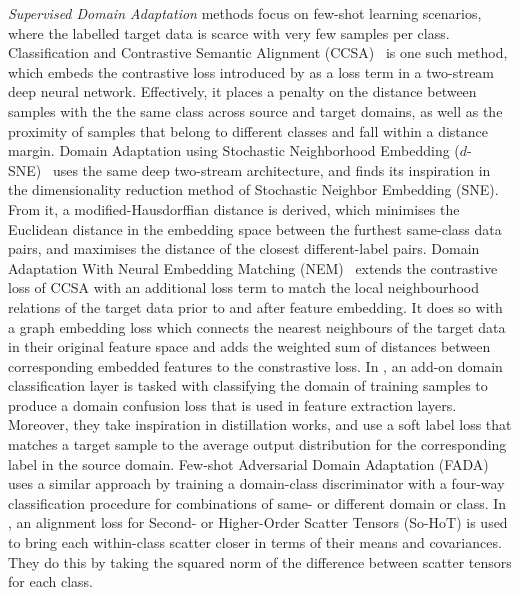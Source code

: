 \documentclass[journal]{IEEEtran}
\begin{document}
\textit{Supervised Domain Adaptation} methods focus on few-shot learning scenarios, where the labelled target data is scarce with very few samples per class. 
Classification and Contrastive Semantic Alignment (CCSA)~\cite{motiian2017ccsa} is one such method, which embeds the contrastive loss introduced by \citet{hadsell2006dimensionality} as a loss term in a two-stream deep neural network. Effectively, it places a penalty on the distance between samples with the the same class across source and target domains, as well as the proximity of samples that belong to different classes and fall within a distance margin.
Domain Adaptation using Stochastic Neighborhood Embedding ($d$-SNE)~\cite{xu2019dsne} uses the same deep two-stream architecture, and finds its inspiration in the dimensionality reduction method of Stochastic Neighbor Embedding (SNE). From it, a modified-Hausdorffian distance is derived, which minimises the Euclidean distance in the embedding space between the furthest same-class data pairs, and maximises the distance of the closest different-label pairs.
Domain Adaptation With Neural Embedding Matching (NEM)~\cite{wang2019nem} extends the contrastive loss of CCSA with an additional loss term to match the local neighbourhood relations of the target data prior to and after feature embedding. It does so with a graph embedding loss which connects the nearest neighbours of the target data in their original feature space and adds the weighted sum of distances between corresponding embedded features to the constrastive loss.
In \cite{tzeng2015simultaneous}, an add-on domain classification layer is tasked with classifying the domain of training samples to produce a domain confusion loss that is used in feature extraction layers. Moreover, they take inspiration in distillation works, and use a soft label loss that matches a target sample to the average output distribution for the corresponding label in the source domain.
Few-shot Adversarial Domain Adaptation (FADA)~\cite{motiian2017fada} uses a similar approach by training a domain-class discriminator with a four-way classification procedure for combinations of same- or different domain or class.
In \cite{koniusz2017domain}, an alignment loss for Second- or Higher-Order Scatter Tensors (So-HoT) is used to bring each within-class scatter closer in terms of their means and covariances. They do this by taking the squared norm of the difference between scatter tensors for each class.
\end{document}
